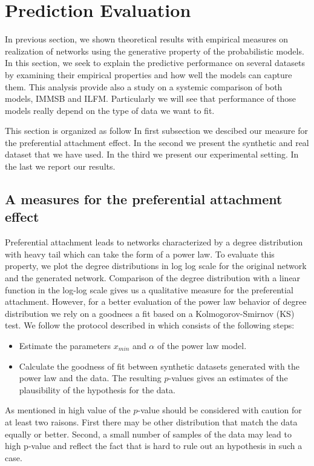 \section{Prediction Evaluation}
\label{sec:experiments}

In previous section, we shown theoretical results with empirical measures  on realization of networks using the generative property of the probabilistic models. In this section, we seek to explain the predictive performance on several datasets by examining their empirical properties and how well the models can capture them. This analysis provide also a study on a systemic comparison of both models, IMMSB and ILFM. Particularly we will see that performance of those models really depend on the type of data we want to fit.

This section is organized as follow In first subsection we descibed our measure for the preferential attachment effect. In the second we present the synthetic and real dataset that we have used. In the third we present our experimental setting. In the last we report our results.

\subsection{A measures for the preferential attachment effect}

Preferential attachment leads to networks characterized by a degree distribution with heavy tail which can take the form of a power law. To evaluate this property,  we  plot the degree distributions in log log scale for the original network and the generated network. Comparison of the degree distribution with a linear function in the log-log scale  gives us a qualitative measure for the preferential attachment. However, for a better evaluation of the power law behavior of degree distribution we rely on a  goodnees a fit based on a Kolmogorov-Smirnov (KS) test. We follow the protocol described in \cite{clauset2009power} which consists of the following steps:
\begin{itemize}
	\item Estimate the parameters $x_{min}$ and $\alpha$ of the power law model.
	\item Calculate the goodness of fit between synthetic datasets generated with the power law and the data. The resulting $p$-values gives an estimates of the          plausibility of the hypothesis for the data.
\end{itemize}

As mentioned in \cite{clauset2009power} high value of the $p$-value should be considered with caution for at least two raisons. First there may be other distribution that match the data equally or better. Second, a small number of samples of the data may lead to high p-value and reflect the fact that is hard to rule out an hypothesis in such a case.

